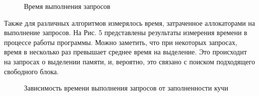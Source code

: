 \documentclass[12pt,a4paper]{article}
\begin{document}
   \begin{figure}[p]
   \caption{Время выполнения запросов}
   \label{ris:image}
   \end{figure}
   
   Также для различных алгоритмов измерялось время, затраченное аллокаторами на выполнение запросов. На Рис. 5 представлены результаты измерения времени в процессе
   работы программы. Можно заметить, что при некоторых запросах, время в несколько раз превышает среднее время на выделение. Это происходит на запросах о 
   выделении памяти, и, вероятно, это связано с поиском подходящего свободного блока. 
   
   \begin{figure}[p]
   \caption{Зависимость времени выполнения запросов от заполненности кучи}
   \label{ris:image}
   \end{figure}
   
\end{document}
